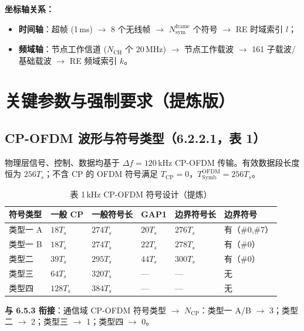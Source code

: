 \documentclass[11pt,a4paper]{ctexart}
\begin{document}
\textbf{坐标轴关系：}
\begin{itemize}[nosep]
  \item \textbf{时间轴}：超帧 (1\,ms) $\rightarrow$ 8 个无线帧 $\rightarrow$ $N_{\mathrm{sym}}^{\mathrm{frame}}$ 个符号 $\rightarrow$ RE 时域索引 $l$；
  \item \textbf{频域轴}：节点工作信道 ($N_{\mathrm{CH}}$ 个 20\,MHz) $\rightarrow$ 节点工作载波 $\rightarrow$ 161 子载波/基础载波 $\rightarrow$ RE 频域索引 $k$。
\end{itemize}

\section{关键参数与强制要求（提炼版）}

\subsection{CP-OFDM 波形与符号类型（6.2.2.1，表 1）}

物理层信号、控制、数据均基于 $\Delta f = 120$\,kHz CP-OFDM 传输。有效数据段长度恒为 $256 T_s$；不含 CP 的 OFDM 符号满足 $T_{\mathrm{CP}}=0$，$T_{\mathrm{Symb}}^{\mathrm{OFDM}} = 256 T_s$。

\begin{table}[h]
\centering
\caption{表 1\,kHz CP-OFDM 符号设计（提炼）}
\small
\begin{tabular}{L{1.8cm}lllll}
\toprule
\textbf{符号类型} & \textbf{一般 CP} & \textbf{一般符号长} &
\textbf{GAP1} & \textbf{边界符号长} & \textbf{边界符号} \\
\midrule
类型一 A & $18T_s$ & $274T_s$ & $20T_s$ & $276T_s$ & 有（\#0,\#7） \\
类型一 B & $18T_s$ & $274T_s$ & $22T_s$ & $278T_s$ & 有（\#0） \\
类型二 & $39T_s$ & $295T_s$ & $44T_s$ & $300T_s$ & 有（\#0） \\
类型三 & $64T_s$ & $320T_s$ & --- & --- & 无 \\
类型四 & $128T_s$ & $384T_s$ & --- & --- & 无 \\
\bottomrule
\end{tabular}
\end{table}

\textbf{与 6.5.3 衔接}：通信域 CP-OFDM 符号类型 $\rightarrow$ $N_{\mathrm{CP}}$：类型一 A/B $\rightarrow$ 3；类型二 $\rightarrow$ 2；类型三 $\rightarrow$ 1；类型四 $\rightarrow$ 0。
\end{document}
